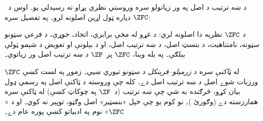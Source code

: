 \documentclass[../../../include/open-logic-section]{subfiles}
\begin{document}

د ښه ترتيب د اصل په ور زياتولو سره وروستي نظري پړاو ته رسېدلي
يو۔ اوس د~$\ZFC$ دپاره ټول اړين اصلونه لرو۔ په تفصيل سره:

\begin{defn}
د $\ZFC$ نظريه دا اصلونه لري: د غړو له مخې برابري، اتحاد، جوړې،
د فرعي سټونو سټونه، نامتناهيت، د بنسټ اصل، د ښه ترتيب اصل،
او د بېلونې او تعويض د شېمو ټولې بېلګې۔ په بله وينا، $\ZFC$ پر~$\ZF$ د ښه
ترتيب اصل ور زياتوي۔
\end{defn}

$\ZFC$ له \emph{ټاکنې} سره د \emph{زرمېلو--فرېنکل} د سټونو
تيوري ښيي۔ زموږ په لست کښې ورزيات شوے اصل د ښه ترتيب اصل دے۔
کله چې وروسته د {ټاکنې اصل} په رسمي ډول بيان کړو، څرګنده
به شي چې ښه ترتيب (د~$\ZF$ په چوکاټ کښې) له ټاکنې سره
همارزښته دے (وګورئ
)۔ نو کوم يو چې خپل «بنسټيز»
اصل وګڼو، توپير نه کوي۔ او د «$\ZFC$» نوم په ادبياتو کښې پوره
عام دے۔
\end{document}
